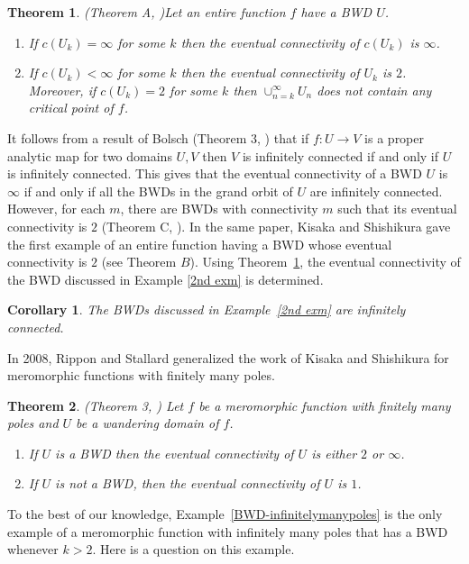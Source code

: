 \documentclass[11pt,a4paper]{article}
\newtheorem{theorem}{Theorem}[section]
\newtheorem{corollary}{Corollary}[theorem]
\begin{document}
	\begin{theorem}(Theorem A, \cite{KisakaShishikura 2008})\label{connectivity}
		Let  an entire function $f$ have  a BWD $U$. 
		\begin{enumerate}
			\item If $c(U_k)=\infty$ for some $k$ then the eventual connectivity of $c(U_k)$ is $\infty$.
			
			\item If $c(U_k)<\infty$ for some $k$  then the eventual connectivity of $U_k$ is $2$. Moreover, if 
		 $c(U_k)=2$ for some $k$  then $\cup_{n=k}^{\infty}U_n$ does not contain any critical point of $f$.
		\end{enumerate}
	\end{theorem}
   It follows from a result of Bolsch (Theorem $3$, \cite{Bolsch 1999}) that if $f: U \to V$ is a proper analytic map for two domains $U,V$ then $V$ is infinitely connected if and only if $U$ is infinitely connected. This gives that the eventual connectivity of a BWD $U$ is $\infty$ if and only if all the BWDs in the grand orbit of $U$ are infinitely connected. However, for each $m$, there are BWDs with connectivity $m$ such that its eventual connectivity is $2$ (Theorem C, \cite{KisakaShishikura 2008}). In the same paper, Kisaka and Shishikura   gave the first example of an entire function having a BWD whose eventual connectivity is $2$ (see Theorem $B$). Using Theorem~\ref{connectivity},  the eventual connectivity of the BWD discussed in Example \ref{2nd exm} is determined.
	\begin{corollary} The BWDs discussed in Example~\ref{2nd exm} are infinitely connected.
	\label{SecondExample-eventualconnectivity}
\end{corollary}

In 2008, Rippon and Stallard generalized the work of Kisaka and Shishikura for meromorphic functions with finitely many poles.
	\begin{theorem}(Theorem 3, \cite{RipponStallard 2008})
		Let $f$ be a meromorphic function with finitely many poles and $U$ be a wandering domain of $f$.
		\begin{enumerate}
			\item If $U$ is a BWD then the eventual connectivity of $U$ is either $2$ or $\infty$.
			\item If $U$ is not a BWD, then the eventual connectivity of $U$ is $1$.
		\end{enumerate}
		\label{eventual-mero}
	\end{theorem}
 To the best of our knowledge, Example~\ref{BWD-infinitelymanypoles} is the only example  of a meromorphic function with infinitely many poles that has a BWD whenever $k >2$. Here is a question on this example.
 
\end{document}
